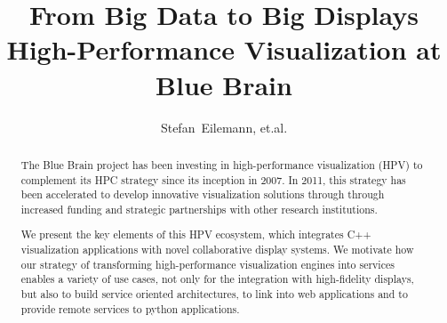 \documentclass[10pt]{llncs}
\begin{document}
\lstset{language=[11]C++,basicstyle=\scriptsize,captionpos=b}
%
\title{From Big Data to Big Displays\\
High-Performance Visualization at Blue Brain}

%
%
%
%

\author{Stefan~Eilemann, et.al.}

\maketitle


\begin{abstract}
  The Blue Brain project has been investing in high-performance visualization
  (HPV) to complement its HPC strategy since its inception in 2007. In 2011,
  this strategy has been accelerated to develop innovative visualization
  solutions through through increased funding and strategic partnerships with
  other research institutions.

  We present the key elements of this HPV ecosystem, which integrates C++
  visualization applications with novel collaborative display systems. We
  motivate how our strategy of transforming high-performance visualization
  engines into services enables a variety of use cases, not only for the
  integration with high-fidelity displays, but also to build service oriented
  architectures, to link into web applications and to provide remote services to
  python applications.
\end{abstract}
\end{document}
